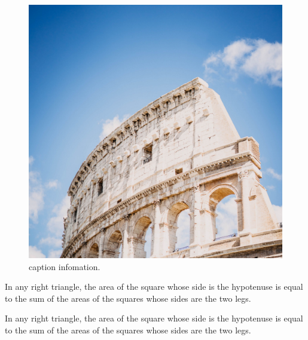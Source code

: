 %
\begin{figure}[!htbp]
    \begin{mdframed}[userdefinedwidth=0.4\textwidth,align=center]
        \centering
        \includegraphics[width=1\textwidth]{./assets/img/background/colosseum_architecture_building_147889_2780x2780.jpg}
        \caption{caption infomation.}
        \label{fig:example4}
    \end{mdframed}
\end{figure}

\begin{mdframed}[style=mdfexample1]
    In any right triangle, the area of the square whose side is the hypotenuse
    is equal to the sum of the areas of the squares whose sides are the two
    legs.
\end{mdframed}

\begin{mdframed}[backgroundcolor=gray!40,shadow=true,roundcorner=8pt]
    In any right triangle, the area of the square whose side is the hypotenuse
    is equal to the sum of the areas of the squares whose sides are the two
    legs.
\end{mdframed}

\newrobustcmd{}


